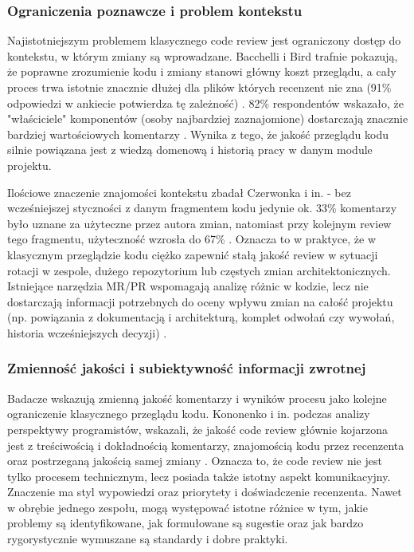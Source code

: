 \subsubsection*{Ograniczenia poznawcze i problem kontekstu}
Najistotniejszym problemem klasycznego code review jest ograniczony dostęp do kontekstu, w którym zmiany
są wprowadzane. Bacchelli i Bird trafnie pokazują, że poprawne zrozumienie kodu i zmiany stanowi główny koszt przeglądu, a
cały proces trwa istotnie znacznie dłużej dla plików których recenzent nie zna (91\% odpowiedzi w ankiecie potwierdza tę zależność) \cite{bacchelli2013}.
82\% respondentów wskazało, że "właściciele" komponentów (osoby najbardziej zaznajomione) dostarczają znacznie bardziej
wartościowych komentarzy \cite{bacchelli2013}.
Wynika z tego, że jakość przeglądu kodu silnie powiązana jest z wiedzą domenową i historią pracy w danym module projektu.

Ilościowe znaczenie znajomości kontekstu zbadał Czerwonka i in. - bez wcześniejszej styczności
z danym fragmentem kodu jedynie ok. 33\% komentarzy było uznane za użyteczne przez autora zmian, natomiast przy kolejnym
review tego fragmentu, użyteczność wzrosła do 67\% \cite{czerwonka2015}. Oznacza to w praktyce, że w klasycznym
przeglądzie kodu ciężko zapewnić stałą jakość review w sytuacji rotacji w zespole, dużego repozytorium lub częstych zmian
architektonicznych. Istniejące narzędzia MR/PR wspomagają analizę różnic w kodzie, lecz nie dostarczają
informacji potrzebnych do oceny wpływu zmian na całość projektu (np. powiązania z dokumentacją i architekturą,
komplet odwołań czy wywołań, historia wcześniejszych decyzji) \cite{bacchelli2013, kononenko2016}.

\subsubsection*{Zmienność jakości i subiektywność informacji zwrotnej}
Badacze wskazują zmienną jakość komentarzy i wyników procesu jako kolejne ograniczenie klasycznego przeglądu kodu.
Kononenko i in. podczas analizy perspektywy programistów, wskazali, że jakość code review głównie kojarzona jest z treściwością
i dokładnością komentarzy, znajomością kodu przez recenzenta oraz postrzeganą jakością samej zmiany \cite{kononenko2016}.
Oznacza to, że code review nie jest tylko procesem technicznym, lecz posiada także istotny aspekt komunikacyjny.
Znaczenie ma styl wypowiedzi oraz priorytety i doświadczenie recenzenta. Nawet w obrębie jednego zespołu,
mogą występować istotne różnice w tym, jakie problemy są identyfikowane, jak formułowane są sugestie oraz jak bardzo
rygorystycznie wymuszane są standardy i dobre praktyki.

